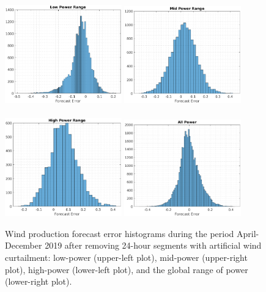 \documentclass[11pt]{article}
\theoremstyle{definition}
\begin{document}
\begin{figure}[H]
\centering
\includegraphics[width=0.45\textwidth]{plots/LP.eps}
\includegraphics[width=0.45\textwidth]{plots/MP.eps}\\
\quad\\
\includegraphics[width=0.45\textwidth]{plots/HP.eps}
\includegraphics[width=0.45\textwidth]{plots/AP.eps}
\caption{Wind production forecast error histograms during the period April-December 2019 after removing 24-hour segments with artificial wind curtailment: low-power (upper-left plot), mid-power (upper-right plot), high-power (lower-left plot), and the global range of power (lower-right plot).}
  \label{fig:data_after_clean}
\end{figure}
\end{document}

